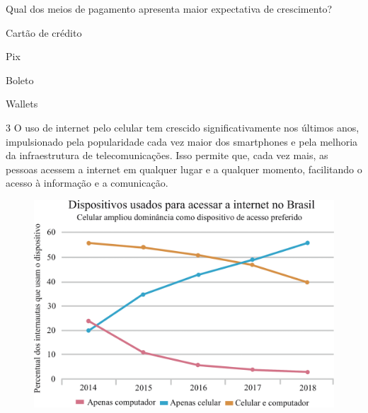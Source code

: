 

Qual dos meios de pagamento apresenta maior expectativa de crescimento?

\begin{escolha}
  \item Cartão de crédito

  \item Pix

  \item Boleto

  \item Wallets
\end{escolha}

\pagebreak
\num{3} O uso de internet pelo celular tem crescido significativamente nos
últimos anos, impulsionado pela popularidade cada vez maior dos
smartphones e pela melhoria da infraestrutura de telecomunicações. Isso
permite que, cada vez mais, as pessoas acessem a internet em qualquer lugar e a qualquer
momento, facilitando o acesso à informação e a comunicação.

\begin{figure}[htpb!]
\centering
\includegraphics[width=\textwidth]{./ilustras-mat/modulo_13_-treino_3.png}
\end{figure}

